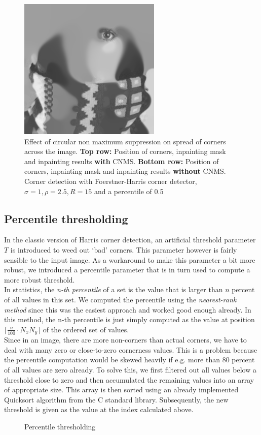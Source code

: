 \begin{figure}
    \includegraphics[width=0.31\linewidth]{../Images/trui-inpaint_non_cnms.png}
    \caption{Effect of circular non maximum suppression on spread of corners across the image.
        \textbf{Top row:} Position of corners, inpainting mask and inpainting results
        \textbf{with} CNMS.
\textbf{Bottom row:} Position of corners, inpainting mask and inpainting results \textbf{without} CNMS.
    Corner detection with Foerstner-Harris corner detector, $\sigma=1,\rho=2.5,R=15$ and a
percentile of 0.5}
\end{figure}

\subsection{Percentile thresholding}\label{sub:Percentile}
In the classic version of Harris corner detection, an artificial threshold parameter $T$ is
introduced to weed out `bad' corners. This parameter however is fairly sensible to the input image.
 As a workaround to make this parameter a bit more robust, we introduced a percentile
parameter that is in turn used to compute a more robust threshold.\\
In statistics, the \textit{n-th percentile} of a set is the value that is larger than $n$ percent
of all values in this set.
We computed the percentile using the \textit{nearest-rank method} since this was the easiest
approach and worked good enough already. In this method, the n-th percentile is just simply
computed as the value at position $\lceil \frac{n}{100}\cdot N_xN_y\rceil$ of the ordered set of values.\\
Since in an image, there are more non-corners than actual corners, we have to deal with many zero
or close-to-zero cornerness values. This is a problem because the percentile computation would be skewed
heavily if e.g. more than 80 percent of all values are zero already. To solve this, we first filtered
out all values below a threshold close to zero and then accumulated the remaining values into an
array of appropriate size. This array is then sorted using an already implemented Quicksort
algorithm from the C standard library. Subsequently, the new threshold is given as the value at
the index calculated above.\\
\begin{figure}[ht]
    
    \caption{Percentile thresholding}
\end{figure}

